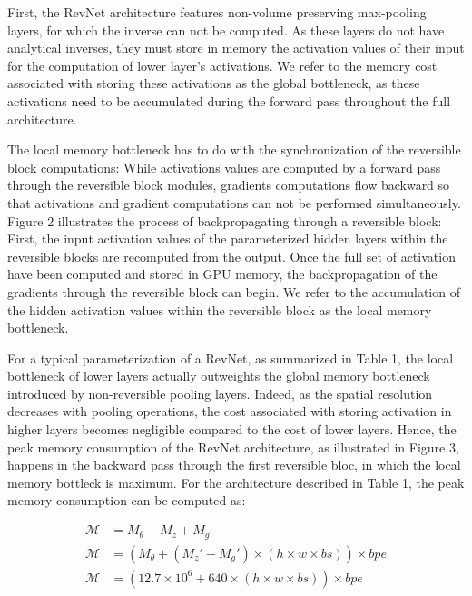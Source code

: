 \documentclass[twocolumn]{bmcart}
\begin{document}
First, the RevNet architecture features non-volume preserving max-pooling layers, for which the inverse can not be computed. 
As these layers do not have analytical inverses, they must store in memory the activation values of their input for the computation of lower layer's activations. 
We refer to the memory cost associated with storing these activations as the global bottleneck, as these activations need to be accumulated during the forward pass throughout the full architecture.

The local memory bottleneck has to do with the synchronization of the reversible block computations:
While activations values are computed by a forward pass through the reversible block modules, 
gradients computations flow backward so that activations and gradient computations can not be performed simultaneously.
Figure 2 illustrates the process of backpropagating through a reversible block:
First, the input activation values of the parameterized hidden layers within the reversible blocks are recomputed from the output.
Once the full set of activation have been computed and stored in GPU memory, the backpropagation of the gradients through the reversible block can begin. 
We refer to the accumulation of the hidden activation values within the reversible block as the local memory bottleneck.

For a typical parameterization of a RevNet, as summarized in Table 1, the local bottleneck of lower layers actually outweights the global memory bottleneck introduced by non-reversible pooling layers.
Indeed, as the spatial resolution decreases with pooling operations, the cost associated with storing activation in higher layers becomes negligible compared to the cost of lower layers.
Hence, the peak memory consumption of the RevNet architecture, as illustrated in Figure 3, happens in the backward pass through the first reversible bloc,
in which the local memory bottleck is maximum.
For the architecture described in Table 1, the peak memory consumption can be computed as:

\begin{subequations}
\begin{align}
\mathcal{M} &= M_{\theta} + M_{z} + M_{g} \\
\mathcal{M} &= (M_{\theta} + (M_z' + M_{g}') \times (h \times w \times bs)) \times bpe \\
\mathcal{M} &= (12.7 \times 10^6 + 640 \times (h \times w \times bs)) \times bpe \\
\end{align}
\end{subequations}
\end{document}
